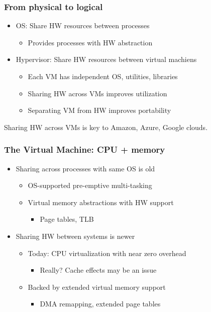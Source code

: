 \documentclass{beamer}
\begin{document}
\begin{frame}
  \frametitle{From physical to logical}

  \begin{itemize}
  \item OS: Share HW resources between processes
    \begin{itemize}
    \item Provides processes with HW abstraction
    \end{itemize}
  \item Hypervisor: Share HW resources between virtual machiens
    \begin{itemize}
    \item Each VM has independent OS, utilities, libraries
    \item Sharing HW across VMs improves utilization
    \item Separating VM from HW improves portability
    \end{itemize}
  \end{itemize}
  Sharing HW across VMs is key to Amazon, Azure, Google clouds.
\end{frame}


\begin{frame}
  \frametitle{The Virtual Machine: CPU + memory}

  \begin{itemize}
  \item Sharing across processes with same OS is old
    \begin{itemize}
    \item OS-supported pre-emptive multi-tasking
    \item Virtual memory abstractions with HW support
      \begin{itemize}
      \item Page tables, TLB
      \end{itemize}
    \end{itemize}
  \item Sharing HW between systems is newer
    \begin{itemize}
    \item Today: CPU virtualization with near zero overhead
      \begin{itemize}
      \item Really?  Cache effects may be an issue
      \end{itemize}
    \item Backed by extended virtual memory support
      \begin{itemize}
      \item DMA remapping, extended page tables
      \end{itemize}
    \end{itemize}
  \end{itemize}
\end{frame}
\end{document}

